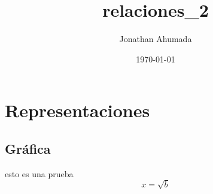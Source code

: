 \documentclass[11pt]{article}
\author{Jonathan Ahumada}
\date{\today}
\title{relaciones\_2}
\begin{document}
\maketitle
\tableofcontents

\section{Representaciones}
\label{sec-1}
\subsection{Gráfica}
\label{sec-1-1}
esto es una prueba
\begin{equation}
x= \sqrt{b}
\end{equation}
\end{document}
